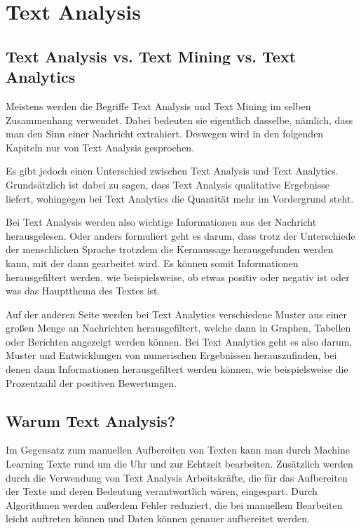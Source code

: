 \section{Text Analysis}\label{sec:text-analysis}

\subsection{Text Analysis vs. Text Mining vs. Text Analytics}\label{subsec:text-analysis-vs-text-mining-vs-text-analytics}

Meistens werden die Begriffe Text Analysis und Text Mining im selben Zusammenhang verwendet.
Dabei bedeuten sie eigentlich dasselbe, nämlich, dass man den Sinn einer Nachricht extrahiert.
Deswegen wird in den folgenden Kapiteln nur von Text Analysis gesprochen.

Es gibt jedoch einen Unterschied zwischen Text Analysis und Text Analytics.
Grundsätzlich ist dabei zu sagen, dass Text Analysis qualitative Ergebnisse liefert, wohingegen bei Text Analytics die Quantität mehr im Vordergrund steht.\cite{textAnalysisMonkeylearn, machineLearningTextAnalysis}

Bei Text Analysis werden also wichtige Informationen aus der Nachricht herausgelesen.
Oder anders formuliert geht es darum, dass trotz der Unterschiede der menschlichen Sprache trotzdem die Kernaussage herausgefunden werden kann, mit der dann gearbeitet wird.
Es können somit Informationen herausgefiltert werden, wie beispielsweise, ob etwas positiv oder negativ ist oder was das Hauptthema des Textes ist.\cite{textAnalysisMonkeylearn, machineLearningTextAnalysis}

Auf der anderen Seite werden bei Text Analytics verschiedene Muster aus einer großen Menge an Nachrichten herausgefiltert, welche dann in Graphen, Tabellen oder Berichten angezeigt werden können.
Bei Text Analytics geht es also darum, Muster und Entwicklungen von numerischen Ergebnissen herauszufinden, bei denen dann Informationen herausgefiltert werden können, wie beispielsweise die Prozentzahl der positiven Bewertungen.\cite{textAnalysisMonkeylearn, machineLearningTextAnalysis}

\subsection{Warum Text Analysis?}\label{subsec:why-text-analysis}

Im Gegensatz zum manuellen Aufbereiten von Texten kann man durch Machine Learning Texte rund um die Uhr und zur Echtzeit bearbeiten.
Zusätzlich werden durch die Verwendung von Text Analysis Arbeitskräfte, die für das Aufbereiten der Texte und deren Bedeutung verantwortlich wären, eingespart.
Durch Algorithmen werden außerdem Fehler reduziert, die bei manuellem Bearbeiten leicht auftreten können und Daten können genauer aufbereitet werden.\cite{textAnalysisMonkeylearn}

